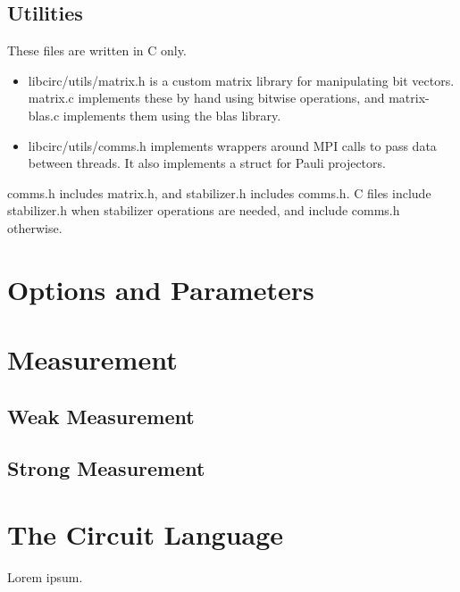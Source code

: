 \documentclass[11pt]{article}
\begin{document}
\subsection{Utilities}

These files are written in C only. 
\begin{itemize}
    \item libcirc/utils/matrix.h is a custom matrix library for manipulating bit vectors. \mbox{matrix.c} implements these by hand using bitwise operations, and \mbox{matrix-blas.c} implements them using the blas library.
    \item libcirc/utils/comms.h implements wrappers around MPI calls to pass data between threads. It also implements a struct for Pauli projectors.
\end{itemize}

comms.h includes matrix.h, and stabilizer.h includes comms.h. C files include \mbox{stabilizer.h} when stabilizer operations are needed, and include comms.h otherwise.

\section{Options and Parameters}
\section{Measurement}
\subsection{Weak Measurement}
\subsection{Strong Measurement}
\section{The Circuit Language} \label{sec:lang}
Lorem ipsum.
\end{document}
